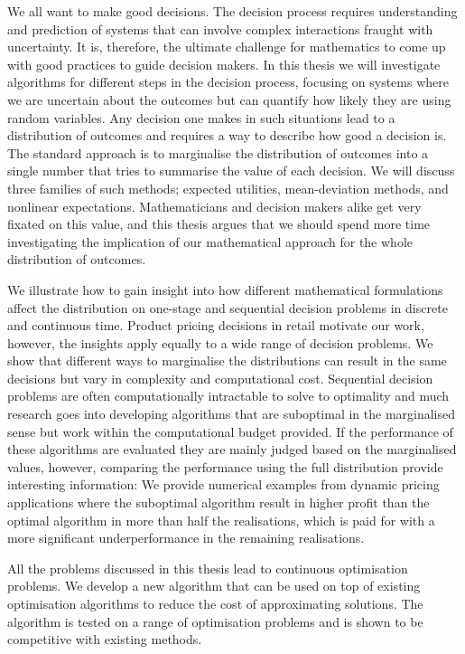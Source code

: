 \documentclass[main.tex]{subfiles}
\begin{document}
We all want to make good decisions. The decision
process requires understanding and prediction of systems that can
involve complex interactions fraught with uncertainty. It is, therefore,
the ultimate challenge for mathematics to come up with good practices
to guide decision makers.  In this thesis we will investigate
algorithms for different steps in the decision process, focusing on
systems where we are uncertain about the outcomes but can quantify how
likely they are using random variables.  Any decision one makes in
such situations lead to a distribution of outcomes and requires a way
to describe how good a decision is.  The standard approach is to
marginalise the distribution of outcomes into a single number that
tries to summarise the value of each decision.  We will discuss three
families of such methods; expected utilities, mean-deviation methods,
and nonlinear expectations.  Mathematicians and decision makers alike
get very fixated on this value, and this thesis argues that we should
spend more time investigating the implication of our mathematical
approach for the whole distribution of outcomes.

We illustrate how to gain insight into how different mathematical
formulations affect the distribution on one-stage and sequential
decision problems in discrete and continuous time. Product pricing
decisions in retail motivate our work, however, the insights
apply equally to a wide range of decision problems.  We show that
different ways to marginalise the distributions can result in the same
decisions but vary in complexity and computational
cost. Sequential decision problems are often computationally
intractable to solve to optimality and much research goes into
developing algorithms that are suboptimal in the marginalised sense
but work within the computational budget provided. If the performance
of these algorithms are evaluated they are mainly judged based on the
marginalised values, however, comparing the performance using the full
distribution provide interesting information: We provide numerical
examples from dynamic pricing applications where the suboptimal
algorithm result in higher profit than the optimal algorithm in more
than half the realisations, which is paid for with a more significant
underperformance in the remaining realisations.

All the problems discussed in this thesis lead to continuous
optimisation problems. We develop a new algorithm that can be used on
top of existing optimisation algorithms to reduce the cost of
approximating solutions. The algorithm is tested on a range of
optimisation problems and is shown to be competitive with existing
methods.
\end{document}
